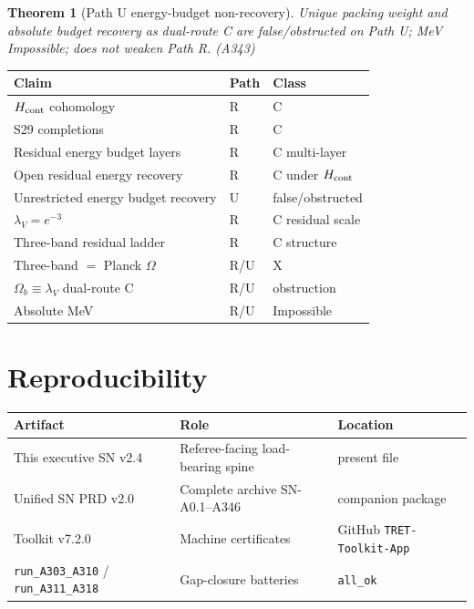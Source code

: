 \documentclass[11pt,a4paper]{article}
\newtheorem{theorem}{Theorem}
\theoremstyle{remark}
\begin{document}
\begin{theorem}[Path U energy-budget non-recovery]
Unique packing weight and absolute budget recovery as dual-route C are false/obstructed on Path U; MeV Impossible; does not weaken Path R. (A343)
\end{theorem}

\begin{center}
\begin{tabular}{@{}p{4.2cm}p{2cm}p{5.5cm}@{}}
\toprule
Claim & Path & Class \\
\midrule
$H_{\rm cont}$ cohomology & R & C \\
S29 completions & R & C \\
Residual energy budget layers & R & C multi-layer \\
Open residual energy recovery & R & C under $H_{\rm cont}$ \\
Unrestricted energy budget recovery & U & false/obstructed \\
$\lambda_V=e^{-3}$ & R & C residual scale \\
Three-band residual ladder & R & C structure \\
Three-band $=$ Planck $\Omega$ & R/U & X \\
$\Omega_b\equiv\lambda_V$ dual-route C & R/U & obstruction \\
Absolute MeV & R/U & Impossible \\
\bottomrule
\end{tabular}
\end{center}

\section{Reproducibility}
\label{sec:repro}

\begin{center}
\begin{tabular}{@{}llp{5.5cm}@{}}
\toprule
\textbf{Artifact} & \textbf{Role} & \textbf{Location} \\
\midrule
This executive SN v2.4 & Referee-facing load-bearing spine & present file \\
Unified SN PRD v2.0 & Complete archive SN-A0.1--A346 & companion package \\
Toolkit v7.2.0 & Machine certificates & GitHub \texttt{TRET-Toolkit-App} \\
\texttt{run\_A303\_A310} / \texttt{run\_A311\_A318} & Gap-closure batteries & \texttt{all\_ok} \\
\bottomrule
\end{tabular}
\end{center}
\end{document}
